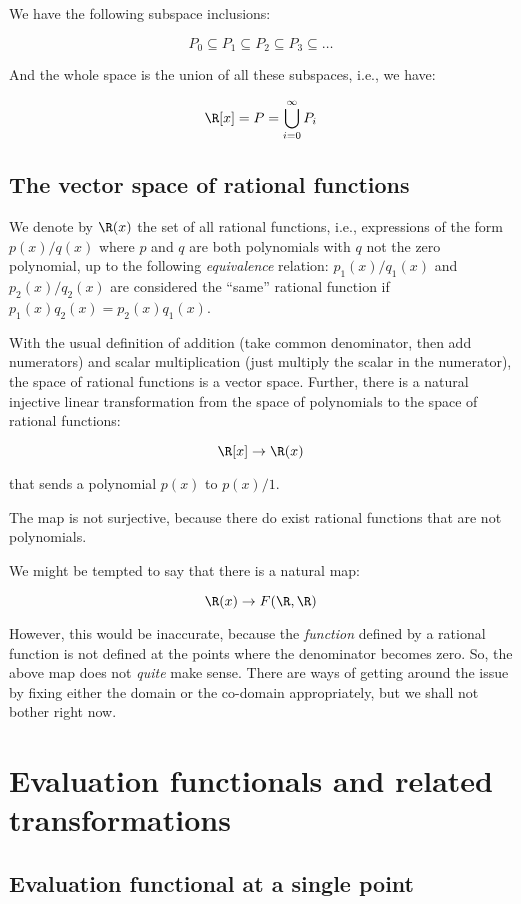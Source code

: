 \documentclass[10pt]{amsart}
\begin{document}
We have the following subspace inclusions:

$$P_0 \subseteq P_1 \subseteq P_2 \subseteq P_3 \subseteq \dots $$

And the whole space is the union of all these subspaces, i.e., we have:

$$\R[x] = P = \bigcup_{i=0}^\infty P_i$$

\subsection{The vector space of rational functions}

We denote by $\R(x)$ the set of all rational functions, i.e.,
expressions of the form $p(x)/q(x)$ where $p$ and $q$ are both
polynomials with $q$ not the zero polynomial, up to the following {\em
  equivalence} relation: $p_1(x)/q_1(x)$ and $p_2(x)/q_2(x)$ are
considered the ``same'' rational function if $p_1(x)q_2(x) =
p_2(x)q_1(x)$.

With the usual definition of addition (take common denominator, then
add numerators) and scalar multiplication (just multiply the scalar in
the numerator), the space of rational functions is a vector
space. Further, there is a natural injective linear transformation
from the space of polynomials to the space of rational functions:

$$\R[x] \to \R(x)$$

that sends a polynomial $p(x)$ to $p(x)/1$.

The map is not surjective, because there do exist rational functions
that are not polynomials.

We might be tempted to say that there is a natural map:

$$\R(x) \to F(\R,\R)$$

However, this would be inaccurate, because the {\em function} defined
by a rational function is not defined at the points where the
denominator becomes zero. So, the above map does not {\em quite} make
sense. There are ways of getting around the issue by fixing either the
domain or the co-domain appropriately, but we shall not bother right
now.

\section{Evaluation functionals and related transformations}

\subsection{Evaluation functional at a single point}
\end{document}
